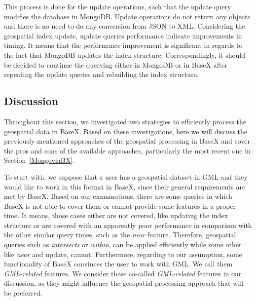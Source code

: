 \documentclass[a4paper,12pt]{article}
\begin{document}


This process is done for the update operations, such that the update query modifies the database in MongoDB. Update operations do not return any objects and there is no need to do any conversion from JSON to XML. Considering the geospatial index update, update queries performance indicate improvements in timing. It means that the performance improvement is significant in regards to the fact that MongoDB updates the index structure. Correspondingly, it should be decided to continue the querying either in MongoDB or in BaseX after repeating the update queries and rebuilding the index structure. 



\subsection{Discussion}
\label{s.disc}
Throughout this section, we investigated two strategies to efficiently process the geospatial data in BaseX. Based on these investigations, here we will discuss the  previously-mentioned approaches of the geospatial processing in BaseX and cover the pros and cons of the available approaches, particularly the most recent one in Section~\ref{MongoviaBX}. 

To start with, we suppose that a user has a geospatial dataset in GML and they would like to work in this format in BaseX, since their general requirements are met by BaseX. Based on our examinations, there are some queries in which BaseX is not able to cover them or cannot provide some features in a proper time. It means, those cases either are not covered, like updating the index structure or are covered with an apparently poor performance in comparison with the other similar query times, such as the \textit{near} feature. Therefore, geospatial queries such as \textit{intersects} or \textit{within}, can be applied efficiently while some other like \textit{near} and update, cannot. Furthermore, regarding to our assumption, some functionality of BaseX convinces the user to work with GML. We call them \textit{GML-related} features. We consider these co-called \textit{GML-related} features in our discussion, as they might influence the geospatial processing approach that will be preferred.
\end{document}
